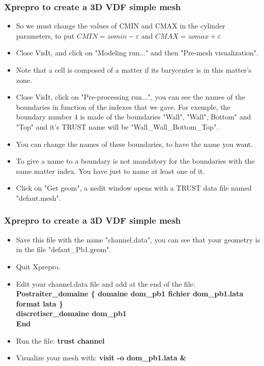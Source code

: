 \documentclass[10pt, hyperref={unicode=true,pdfusetitle, bookmarks=true,bookmarksnumbered=false,bookmarksopen=false, breaklinks=false,pdfborder={0 0 1},backref=true,colorlinks=true,linkcolor=darkblue,pageanchor}]{beamer}
\begin{document}
\begin{frame}
\frametitle{Xprepro to create a 3D VDF simple mesh}
\begin{block}{}

\begin{itemize}
\item So we must change the values of CMIN and CMAX in the cylinder parameters, to put $CMIN=zomin-\varepsilon$ and $CMAX=zomax+\varepsilon$
\item Close VisIt, and click on "Modeling run..." and then "Pre-mesh visualization".
\item Note that a cell is composed of a matter if its barycenter is in this matter's zone.
\item Close VisIt, click on "Pre-processing run...", you can see the names of the boundaries in function of the indexes that we gave. For exemple, the boundary number 4 is made of the boundaries "Wall", "Wall", Bottom" and "Top" and it's TRUST name will be "Wall\_Wall\_Bottom\_Top".
\item You can change the names of these boundaries, to have the name you want.
\item To give a name to a boundary is not mandatory for the boundaries with the same matter index. You have just to name at least one of it.
\item Click on "Get geom", a nedit window opens with a TRUST data file named "defaut.mesh".
\end{itemize}

\end{block}
\end{frame}
\begin{frame}
\frametitle{Xprepro to create a 3D VDF simple mesh}
\begin{block}{}

\begin{itemize}
\item Save this file with the name "channel.data", you can see that your geometry is in the file "defaut\_Pb1.geom".
\item Quit Xprepro.
\item Edit your channel.data file and add at the end of the file: \\
{\small{
\textbf{Postraiter\_domaine \{ domaine dom\_pb1 fichier dom\_pb1.lata format lata \} \\
discretiser\_domaine dom\_pb1 \\
End }
}}
\item Run the file: \textbf{trust channel}
\item Visualize your mesh with: \textbf{visit -o dom\_pb1.lata \& }
\end{itemize}

\end{block}
\end{frame}
\end{document}
